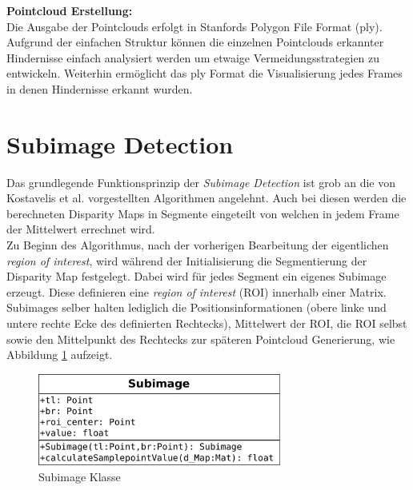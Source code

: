 \noindent
\textbf{Pointcloud Erstellung:}\\
Die Ausgabe der Pointclouds erfolgt in Stanfords Polygon File Format (ply). Aufgrund der einfachen Struktur können die einzelnen Pointclouds erkannter Hindernisse einfach analysiert werden um etwaige Vermeidungsstrategien zu entwickeln. Weiterhin ermöglicht das ply Format die Visualisierung jedes Frames in denen Hindernisse erkannt wurden.

	

\section{Subimage Detection}
\label{sec:mean_disparity_detection}

Das grundlegende Funktionsprinzip der \emph{Subimage Detection} ist grob an die von Kostavelis et al. vorgestellten Algorithmen angelehnt. Auch bei diesen werden die berechneten Disparity Maps in Segmente eingeteilt von welchen in jedem Frame der Mittelwert errechnet wird.\\

\noindent
Zu Beginn des Algorithmus, nach der vorherigen Bearbeitung der eigentlichen \emph{region of interest}, wird während der Initialisierung die Segmentierung der Disparity Map festgelegt. Dabei wird für jedes Segment ein eigenes Subimage erzeugt. Diese definieren eine \emph{region of interest} (ROI) innerhalb einer Matrix. Subimages selber halten lediglich die Positionsinformationen (obere linke und untere rechte Ecke des definierten Rechtecks), Mittelwert der ROI, die ROI selbst sowie den Mittelpunkt des Rechtecks zur späteren Pointcloud Generierung, wie Abbildung \ref{fig:subimage_class} aufzeigt.

\begin{figure}[h]
	\begin{center}
		\includegraphics[width=8cm]{img/subimage_class.pdf}
	\end{center}
	\caption{Subimage Klasse}
	\label{fig:subimage_class}
\end{figure}

